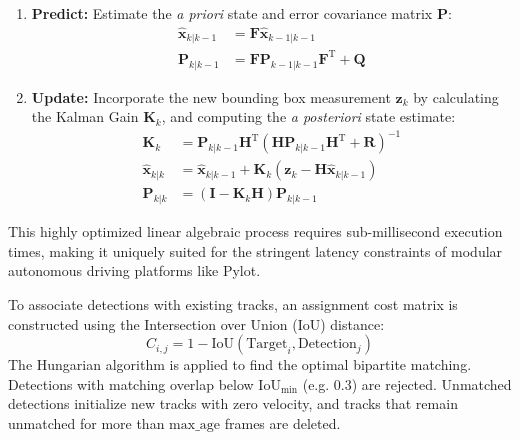 \documentclass[11pt,a4paper]{report}
\begin{document}
\begin{enumerate}
    \item \textbf{Predict:} Estimate the \textit{a priori} state and error covariance matrix $\mathbf{P}$:
    \begin{align}
        \hat{\mathbf{x}}_{k|k-1} &= \mathbf{F} \hat{\mathbf{x}}_{k-1|k-1} \\
        \mathbf{P}_{k|k-1} &= \mathbf{F} \mathbf{P}_{k-1|k-1} \mathbf{F}^{\text{T}} + \mathbf{Q}
    \end{align}
    \item \textbf{Update:} Incorporate the new bounding box measurement $\mathbf{z}_k$ by calculating the Kalman Gain $\mathbf{K}_k$, and computing the \textit{a posteriori} state estimate:
    \begin{align}
        \mathbf{K}_k &= \mathbf{P}_{k|k-1} \mathbf{H}^{\text{T}} (\mathbf{H} \mathbf{P}_{k|k-1} \mathbf{H}^{\text{T}} + \mathbf{R})^{-1} \\
        \hat{\mathbf{x}}_{k|k} &= \hat{\mathbf{x}}_{k|k-1} + \mathbf{K}_k (\mathbf{z}_k - \mathbf{H} \hat{\mathbf{x}}_{k|k-1}) \\
        \mathbf{P}_{k|k} &= (\mathbf{I} - \mathbf{K}_k \mathbf{H}) \mathbf{P}_{k|k-1}
    \end{align}
\end{enumerate}
This highly optimized linear algebraic process requires sub-millisecond execution times, making it uniquely suited for the stringent latency constraints of modular autonomous driving platforms like Pylot.

To associate detections with existing tracks, an assignment cost matrix is constructed using the Intersection over Union (IoU) distance:
\begin{equation}
    C_{i,j} = 1 - \text{IoU}(\text{Target}_i, \text{Detection}_j)
\end{equation}
The Hungarian algorithm is applied to find the optimal bipartite matching. Detections with matching overlap below $\text{IoU}_{\text{min}}$ (e.g. 0.3) are rejected. Unmatched detections initialize new tracks with zero velocity, and tracks that remain unmatched for more than $\text{max\_age}$ frames are deleted.
\end{document}
